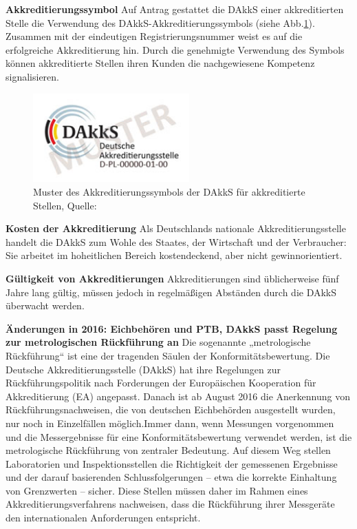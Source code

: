 \textbf{Akkreditierungssymbol}\newline
Auf Antrag gestattet die DAkkS einer akkreditierten Stelle die Verwendung des DAkkS-Akkreditierungssymbols (siehe Abb.\ref{fig:SymbolDAkkS}). Zusammen mit der eindeutigen Registrierungsnummer weist es auf die erfolgreiche Akkreditierung hin. Durch die genehmigte Verwendung des Symbols können akkreditierte Stellen ihren Kunden die nachgewiesene Kompetenz signalisieren.
\begin{figure}[!htp]
	\begin{center}
		\includegraphics[width=60mm]{12_vorlesung/media/SymbolDAkkS.jpg}
		\caption{Muster des Akkreditierungssymbols der DAkkS für akkreditierte Stellen, Quelle:\cite{DAkkS} }
		\label{fig:SymbolDAkkS}
	\end{center}
\end{figure}

\textbf{Kosten der Akkreditierung} \newline
Als Deutschlands nationale Akkreditierungsstelle handelt die DAkkS zum Wohle des Staates, der Wirtschaft und der Verbraucher: Sie arbeitet im hoheitlichen Bereich kostendeckend, aber nicht gewinnorientiert.

\textbf{Gültigkeit von Akkreditierungen} \newline
Akkreditierungen sind üblicherweise fünf Jahre lang gültig, müssen jedoch in regelmäßigen Abständen durch die DAkkS überwacht werden.

\textbf{Änderungen in 2016: Eichbehören und PTB, 
DAkkS passt Regelung zur metrologischen Rückführung an}\newline
Die sogenannte „metrologische Rückführung“ ist eine der tragenden Säulen der Kon\-for\-mitäts\-bewertung. Die Deutsche Akkreditierungsstelle (DAkkS) hat ihre Regelungen zur Rück\-führungs\-politik nach Forderungen der Europäischen Kooperation für Akkreditierung (EA) angepasst. Danach ist ab August 2016 die Anerkennung von Rückführungsnachweisen, die von deutschen Eichbehörden ausgestellt wurden, nur noch in Einzelfällen möglich.Immer dann, wenn Messungen vorgenommen und die Messergebnisse für eine Kon\-formitäts\-bewert\-ung verwendet werden, ist die metrologische Rückführung von zentraler Bedeutung. Auf diesem Weg stellen Laboratorien und Inspektionsstellen die Richtigkeit der gemessenen Ergebnisse und der darauf basierenden Schlussfolgerungen – etwa die korrekte Einhaltung von Grenzwerten – sicher. Diese Stellen müssen daher im Rahmen eines Akkreditierungsverfahrens nachweisen, dass die Rückführung ihrer Messgeräte den internationalen Anforderungen entspricht.


